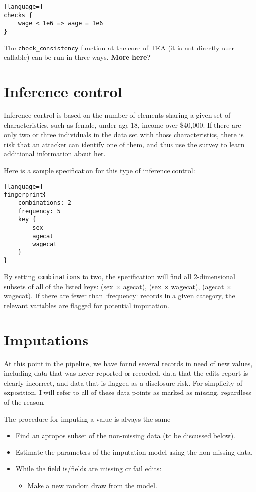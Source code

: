 \documentclass{article}
\begin{document}
\begin{lstlisting}[language=]
checks { 
    wage < 1e6 => wage = 1e6
}
\end{lstlisting}


The {\tt check\_consistency} function at the core of TEA (it is not directly user-callable)
can be run in three ways.
{\bf More here?}


\section{Inference control}

Inference control is based on the number of elements sharing a given set of
characteristics, such as female, under age 18, income over \$40,000. If there are only
two or three individuals in the data set with those characteristics, there is risk
that an attacker can identify one of them, and thus use the survey to learn additional
information about her.

Here is a sample specification for this type of inference control:

\begin{lstlisting}[language=]
fingerprint{
    combinations: 2
    frequency: 5
    key {
        sex
        agecat
        wagecat
    }
}
\end{lstlisting}

By setting {\tt combinations} to two, the specification will find all 2-dimensional subsets of 
all of the listed keys: (sex $\times$ agecat), (sex $\times$ wagecat), (agecat $\times$
wagecat). If there are fewer than `frequency` records in a given category, the relevant
variables are flagged for potential imputation.

\section{Imputations}
At this point in the pipeline, we have found several records in need of new values,
including data that was never reported or recorded, data that the edits report is
clearly incorrect, and data that is flagged as a disclosure risk. For simplicity of
exposition, I will refer to all of these data points as marked as missing, regardless of
the reason.  

The procedure for imputing a value is always the same:

\begin{itemize}
\item Find an apropos subset of the non-missing data (to be discussed below).
\item Estimate the parameters of the imputation model using the non-missing data.
\item While the field is/fields are missing or fail edits:
    \begin{itemize}
    \item Make a new random draw from the model.
    \end{itemize}
\end{itemize}
\end{document}
